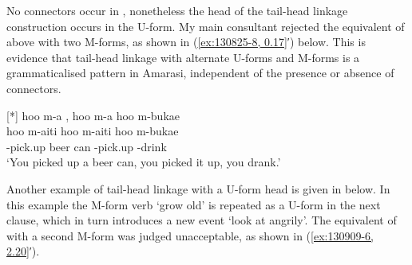 \begin{exe}
	\label{ex:130825-8, 0.17}
	\begin{xlist}
		\label{ex:130825-8, 0.17 a}
		\label{ex:130825-8, 0.17 b}
	\end{xlist}
\end{exe}

No connectors occur in ,
nonetheless the head of the tail-head linkage construction occurs in the U-form.
My main consultant rejected the equivalent of 
above with two M-forms, as shown in (\ref{ex:130825-8, 0.17}′) below.
This is evidence that tail-head linkage with alternate U-forms and M-forms
is a grammaticalised pattern in Amarasi,
independent of the presence or absence of connectors.

\begin{exe}
	{\glll	
						hoo m-a  , hoo m-a hoo m-bukae\\
						hoo m-aiti   hoo m-aiti hoo m-bukae\\
						{\hoo} \m-pick.up{\tbrM} beer can {\hoo} \m-pick.up{\tbrM} {\hoo} \m-drink\\
			\glt	`You picked up a beer can, you picked it up, you drank.'
						}
\end{exe}

Another example of tail-head linkage with a U-form head is given in  below.
In this example the M-form verb  `grow old'
is repeated as a U-form  in the next clause,
which in turn introduces a new event  `look at angrily'.
The equivalent of  with
a second M-form was judged unacceptable, as shown in (\ref{ex:130909-6, 2.20}′).

